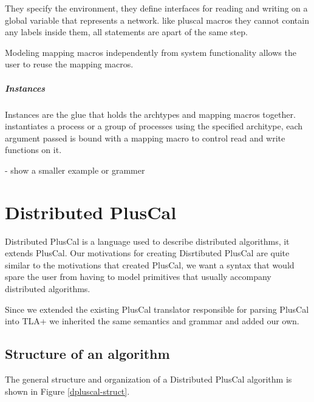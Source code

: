 \documentclass{thesul}
\begin{document}
They specify the environment, they define interfaces for reading and writing on a global variable that represents a network.
like pluscal macros they cannot contain any labels inside them, all statements are apart of the same step.

Modeling mapping macros independently from system functionality allows the user to reuse the mapping macros.

\paragraph{Instances}

Instances are the glue that holds the archtypes and mapping macros together.
instantiates a process or a group of processes using the specified architype, each argument passed is bound with a mapping macro to control read and write functions on it.

- show a smaller example or grammer

\chapter{Distributed PlusCal}

Distributed PlusCal is a language used to describe distributed algorithms, it extends PlusCal. 
Our motivations for creating Disrtibuted PlusCal are quite similar to the motivations that created PlusCal, we want a syntax that would spare the user from having to model primitives that usually accompany distributed algorithms.

Since we extended the existing PlusCal translator responsible for parsing PlusCal into TLA+ we inherited the same semantics and grammar and added our own.

\section{Structure of an algorithm}

The general structure and organization of a Distributed PlusCal algorithm is shown in Figure \ref{dpluscal-struct}.
\end{document}
